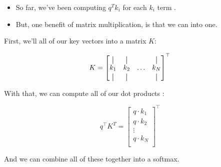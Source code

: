         \begin{itemize}
            \item So far, we've been computing $q^Tk_i$ for each $k_i$ term .

            \item But, one benefit of matrix multiplication, is that we can  into one.
        \end{itemize}

        First, we'll  all of our key vectors into a matrix $K$:

        \begin{equation}
            K = 
            \begin{bmatrix}
                \vertbar & \vertbar  & \     & \vertbar \\
                k_1 & k_2 & \ldots & k_N \\
                \vertbar & \vertbar  &        & \vertbar
            \end{bmatrix}^\top
        \end{equation}

        With that, we can compute all of our dot products :

        \begin{equation}
            q^\top K^T = 
            \begin{bmatrix}
                q \cdot k_1   \\ q \cdot k_2  \\ \vdots \\ q \cdot k_N  \\
            \end{bmatrix}^\top
        \end{equation}

        And we can combine all of these together into a softmax.\\

